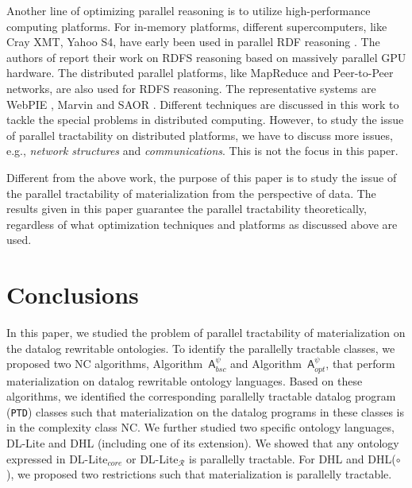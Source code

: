 \documentclass[final,1p,times]{elsarticle}
\begin{document}
Another line of optimizing parallel reasoning is to utilize high-performance computing platforms. For in-memory platforms, different supercomputers, like Cray XMT, Yahoo S4, have early been used in parallel RDF reasoning \cite{Hoeksema2011,GoodmanJMAAH11}. The authors of \cite{HeinoP12} report their work on RDFS reasoning based on massively parallel GPU hardware. The distributed parallel platforms, like MapReduce and Peer-to-Peer networks, are also used for RDFS reasoning. The representative systems are WebPIE \cite{UrbaniKMHB12}, Marvin \cite{oren2009marvin} and SAOR \cite{HoganHP09}. Different techniques are discussed in this work to tackle the special problems in distributed computing. However, to study the issue of parallel tractability on distributed platforms, we have to discuss more issues, e.g., \emph{network structures} and \emph{communications}. This is not the focus in this paper.

Different from the above work, the purpose of this paper is to study the issue of the parallel tractability of materialization from the perspective of data. The results given in this paper guarantee the parallel tractability theoretically, regardless of what optimization techniques and platforms as discussed above are used.


\section{Conclusions}
\label{sec:conclusion}

In this paper, we studied the problem of parallel tractability of
materialization on the datalog rewritable ontologies.
To identify the parallelly tractable classes,
we proposed two NC algorithms, Algorithm~$\mathsf{A}_{bsc}^\psi$
and Algorithm~$\mathsf{A}_{opt}^\psi$, that perform materialization on
datalog rewritable ontology languages.
Based on these algorithms, we identified the corresponding
parallelly tractable datalog program (\texttt{PTD}) classes such that materialization
on the datalog programs in these classes is in the complexity class NC.
We further studied two specific ontology languages, DL-Lite and DHL (including one of its extension).
We showed that any ontology expressed in DL-Lite$_{core}$ or DL-Lite$_{\mathcal{R}}$ is parallelly tractable.
For DHL and DHL($\circ$), we proposed two restrictions such that materialization is parallelly tractable.
\end{document}

